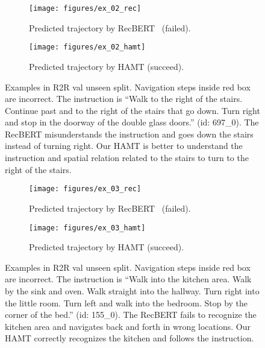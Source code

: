 \begin{figure}
	\centering
	\begin{subfigure}[b]{0.48\textwidth}
		\centering
		\texttt{[image: figures/ex\_02\_rec]}
		\caption{Predicted trajectory by RecBERT~\cite{hong2020recurrent} (failed).}
		\label{fig:ex_02_rec}
	\end{subfigure}
	\hfill
	\begin{subfigure}[b]{0.48\textwidth}
		\centering
		\texttt{[image: figures/ex\_02\_hamt]}
		\caption{Predicted trajectory by HAMT (succeed).}
		\label{fig:ex_02_hamt}
	\end{subfigure}
	\caption{Examples in R2R val unseen split. Navigation steps inside red box are incorrect. The instruction is ``Walk to the right of the stairs. Continue past and to the right of the stairs that go down. Turn right and stop in the doorway of the double glass doors.'' (id: 697\_0). The RecBERT misunderstands the instruction and goes down the stairs instead of turning right. Our HAMT is better to understand the instruction and spatial relation related to the stairs to turn to the right of the stairs.}
	\label{fig:ex_02}
\end{figure}

\begin{figure}
	\centering
	\begin{subfigure}[b]{0.48\textwidth}
		\centering
		\texttt{[image: figures/ex\_03\_rec]}
		\caption{Predicted trajectory by RecBERT~\cite{hong2020recurrent} (failed).}
		\label{fig:ex_03_rec}
	\end{subfigure}
	\hfill
	\begin{subfigure}[b]{0.48\textwidth}
		\centering
		\texttt{[image: figures/ex\_03\_hamt]}
		\caption{Predicted trajectory by HAMT (succeed).}
		\label{fig:ex_03_hamt}
	\end{subfigure}
	\caption{Examples in R2R val unseen split. Navigation steps inside red box are incorrect. The instruction is ``Walk into the kitchen area. Walk by the sink and oven. Walk straight into the hallway. Turn right into the little room. Turn left and walk into the bedroom. Stop by the corner of the bed.'' (id: 155\_0). The RecBERT fails to recognize the kitchen area and navigates back and forth in wrong locations. Our HAMT correctly recognizes the kitchen and follows the instruction.}
	\label{fig:ex_03}
\end{figure}

